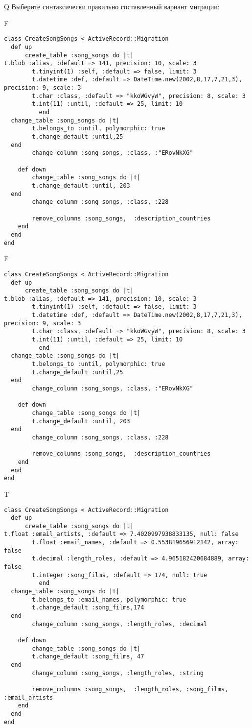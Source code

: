 Q
Выберите синтаксически правильно составленный вариант миграции:

F
\begin{verbatim}
class CreateSongSongs < ActiveRecord::Migration
  def up
	  create_table :song_songs do |t|
t.blob :alias, :default => 141, precision: 10, scale: 3
		t.tinyint(1) :self, :default => false, limit: 3
		t.datetime :def, :default => DateTime.new(2002,8,17,7,21,3), precision: 9, scale: 3
		t.char :class, :default => "kkoWGvyW", precision: 8, scale: 3
		t.int(11) :until, :default => 25, limit: 10
		  end
  change_table :song_songs do |t|
		t.belongs_to :until, polymorphic: true
 		t.change_default :until,25
  end
 		change_column :song_songs, :class, :"ERovNkXG"
   
	def down
		change_table :song_songs do |t|
		t.change_default :until, 203
  end
 		change_column :song_songs, :class, :228
   
		remove_columns :song_songs,  :description_countries 
    end 
  end
end

\end{verbatim}

F
\begin{verbatim}
class CreateSongSongs < ActiveRecord::Migration
  def up
	  create_table :song_songs do |t|
t.blob :alias, :default => 141, precision: 10, scale: 3
		t.tinyint(1) :self, :default => false, limit: 3
		t.datetime :def, :default => DateTime.new(2002,8,17,7,21,3), precision: 9, scale: 3
		t.char :class, :default => "kkoWGvyW", precision: 8, scale: 3
		t.int(11) :until, :default => 25, limit: 10
		  end
  change_table :song_songs do |t|
		t.belongs_to :until, polymorphic: true
 		t.change_default :until,25
  end
 		change_column :song_songs, :class, :"ERovNkXG"
   
	def down
		change_table :song_songs do |t|
		t.change_default :until, 203
  end
 		change_column :song_songs, :class, :228
   
		remove_columns :song_songs,  :description_countries 
    end 
  end
end

\end{verbatim}

T
\begin{verbatim}
class CreateSongSongs < ActiveRecord::Migration
  def up
	  create_table :song_songs do |t|
t.float :email_artists, :default => 7.4020997938833135, null: false
		t.float :email_names, :default => 0.553819656912142, array: false
		t.decimal :length_roles, :default => 4.965182420684889, array: false
		t.integer :song_films, :default => 174, null: true
		  end
  change_table :song_songs do |t|
		t.belongs_to :email_names, polymorphic: true
 		t.change_default :song_films,174
  end
 		change_column :song_songs, :length_roles, :decimal
   
	def down
		change_table :song_songs do |t|
		t.change_default :song_films, 47
  end
 		change_column :song_songs, :length_roles, :string
   
		remove_columns :song_songs,  :length_roles, :song_films, :email_artists 
    end 
  end
end

\end{verbatim}

